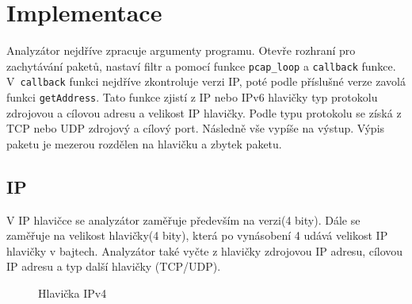 \documentclass[a4paper, 12pt, titlepage]{article}
\begin{document}

\tableofcontents
\newpage

\section{Implementace}
Analyzátor nejdříve zpracuje argumenty programu\cite{getopt}. Otevře rozhraní pro zachytávání paketů, nastaví filtr a pomocí funkce \verb|pcap_loop| a \verb|callback| funkce\cite{pcap}. V~\verb|callback| funkci nejdříve zkontroluje verzi IP, poté podle příslušné verze zavolá funkci \verb|getAddress|. Tato funkce zjistí z IP nebo IPv6 hlavičky typ protokolu zdrojovou a cílovou adresu a velikost IP hlavičky. Podle typu protokolu se získá z TCP nebo UDP zdrojový a cílový port. Následně vše vypíše na výstup. Výpis paketu je mezerou rozdělen na hlavičku a zbytek paketu.

\subsection{IP}
V IP hlavičce se analyzátor zaměřuje především na verzi(4 bity). Dále se zaměřuje na velikost hlavičky(4 bity), která po vynásobení 4 udává velikost IP hlavičky v bajtech.
Analyzátor také vyčte z hlavičky zdrojovou IP adresu, cílovou IP adresu a typ další hlavičky (TCP/UDP).
\renewcommand{\figurename}{Obrázek}
\begin{figure}[H]
    \centering
    \caption{Hlavička IPv4\cite{obr1}}
    \label{obrazek 1}
\end{figure}
\end{document}
